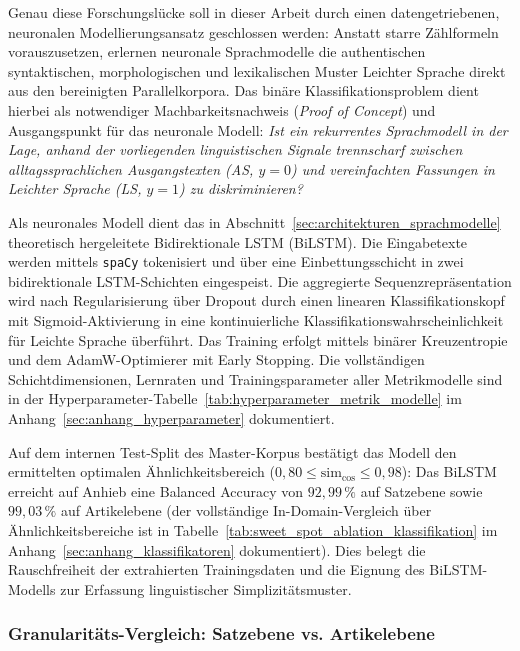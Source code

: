 Genau diese Forschungslücke soll in dieser Arbeit durch einen datengetriebenen, neuronalen Modellierungsansatz geschlossen werden: Anstatt starre Zählformeln vorauszusetzen, erlernen neuronale Sprachmodelle die authentischen syntaktischen, morphologischen und lexikalischen Muster Leichter Sprache direkt aus den bereinigten Parallelkorpora. Das binäre Klassifikationsproblem dient hierbei als notwendiger Machbarkeitsnachweis (\textit{Proof of Concept}) und Ausgangspunkt für das neuronale Modell: \textit{Ist ein rekurrentes Sprachmodell in der Lage, anhand der vorliegenden linguistischen Signale trennscharf zwischen alltagssprachlichen Ausgangstexten (AS, $y=0$) und vereinfachten Fassungen in Leichter Sprache (LS, $y=1$) zu diskriminieren?}

Als neuronales Modell dient das in Abschnitt~\ref{sec:architekturen_sprachmodelle} theoretisch hergeleitete Bidirektionale LSTM (BiLSTM). Die Eingabetexte werden mittels \texttt{spaCy} tokenisiert und über eine Einbettungsschicht in zwei bidirektionale LSTM-Schichten eingespeist. Die aggregierte Sequenzrepräsentation wird nach Regularisierung über Dropout durch einen linearen Klassifikationskopf mit Sigmoid-Aktivierung in eine kontinuierliche Klassifikationswahrscheinlichkeit für Leichte Sprache überführt. Das Training erfolgt mittels binärer Kreuzentropie und dem AdamW-Optimierer \citep{loshchilov2019decoupled} mit Early Stopping. Die vollständigen Schichtdimensionen, Lernraten und Trainingsparameter aller Metrikmodelle sind in der Hyperparameter-Tabelle~\ref{tab:hyperparameter_metrik_modelle} im Anhang~\ref{sec:anhang_hyperparameter} dokumentiert.

Auf dem internen Test-Split des Master-Korpus bestätigt das Modell den ermittelten optimalen Ähnlichkeitsbereich ($0{,}80 \le \text{sim}_{\cos} \le 0{,}98$): Das BiLSTM erreicht auf Anhieb eine Balanced Accuracy von $92{,}99\,\%$ auf Satzebene sowie $99{,}03\,\%$ auf Artikelebene (der vollständige In-Domain-Vergleich über Ähnlichkeitsbereiche ist in Tabelle~\ref{tab:sweet_spot_ablation_klassifikation} im Anhang~\ref{sec:anhang_klassifikatoren} dokumentiert). Dies belegt die Rauschfreiheit der extrahierten Trainingsdaten und die Eignung des BiLSTM-Modells zur Erfassung linguistischer Simplizitätsmuster.

\subsubsection{Granularitäts-Vergleich: Satzebene vs. Artikelebene}
\label{sec:klassifikator_laengen_ablation}


